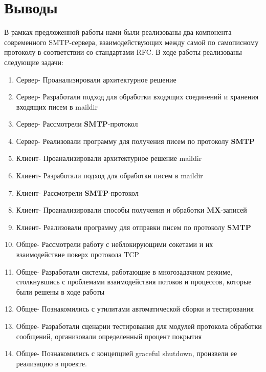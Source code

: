 \documentclass[a4paper,12pt]{report}
\begin{document}

\chapter*{Выводы}

В рамках предложенной работы нами были реализованы два компонента современного SMTP-сервера, взаимодействующих между самой по самописному протоколу в соответствии со стандартами RFC. В ходе работы реализованы следующие задачи: \\
\begin{enumerate}
	\item Сервер- Проанализировали архитектурное решение
    \item Сервер- Разработали подход для обработки входящих соединений и хранения входящих писем в maildir
    \item Сервер- Рассмотрели \textbf{SMTP}-протокол
    \item Сервер- Реализовали программу для получения писем по протоколу \textbf{SMTP}
    \item Клиент- Проанализировали архитектурное решение maildir
    \item Клиент- Разработали подход для обработки писем в maildir 
    \item Клиент- Рассмотрели \textbf{SMTP}-протокол
    \item Клиент- Проанализировали способы получения и обработки \textbf{MX}-записей
    \item Клиент- Реализовали программу для отправки писем по протоколу \textbf{SMTP}
    \item Общее- Рассмотрели работу с неблокирующими сокетами и их взаимодействие поверх протокола TCP
    \item Общее- Разработали системы, работающие в многозадачном режиме, столкнувшись с проблемами взаимодействия потоков и процессов, которые были решены в ходе работы
    \item Общее- Познакомились с утилитами автоматической сборки и тестирования
    \item Общее- Разработали сценарии тестирования для модулей протокола обработки сообщений, организовали определенный процент покрытия
    \item Общее- Познакомились с концепцией graceful shutdown, произвели ее реализацию в проекте.
\end{enumerate}
\end{document}
